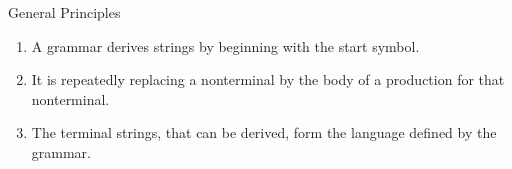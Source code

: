 \begin{bibunit}[apalike]
\begin{frame}{General Principles}
	\begin{enumerate}
	\item A grammar derives strings by beginning with the start symbol.
	\item It is repeatedly replacing a nonterminal by the body of a production for that nonterminal.
	\item The terminal strings, that can be derived, form the language defined by the grammar.
	\end{enumerate}
	\vfill
\end{frame}


\end{bibunit}
